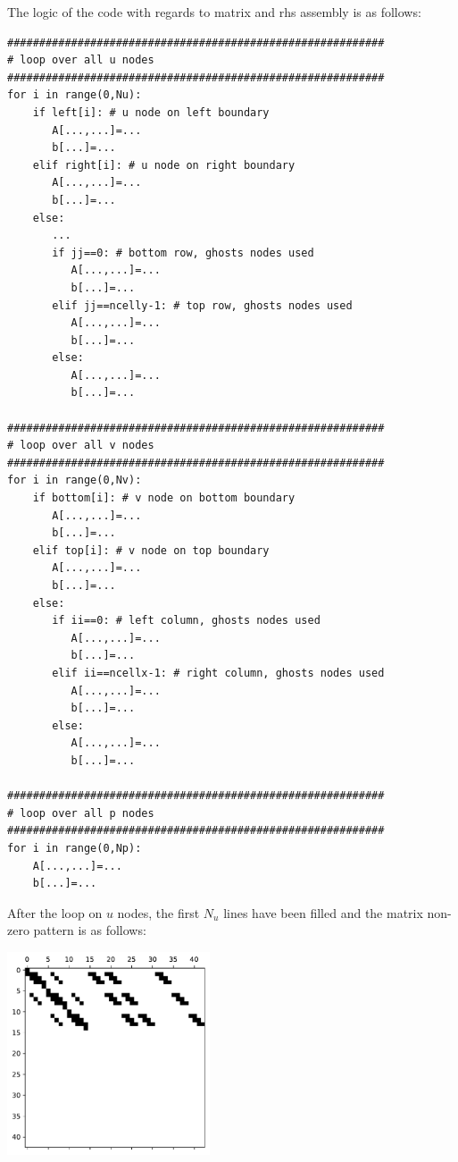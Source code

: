 \newpage
The logic of the code with regards to matrix and rhs assembly is as follows:

\begin{lstlisting}
###########################################################
# loop over all u nodes
###########################################################
for i in range(0,Nu):
    if left[i]: # u node on left boundary
       A[...,...]=...
       b[...]=...
    elif right[i]: # u node on right boundary
       A[...,...]=...
       b[...]=...
    else:
       ...
       if jj==0: # bottom row, ghosts nodes used
          A[...,...]=...
          b[...]=...
       elif jj==ncelly-1: # top row, ghosts nodes used
          A[...,...]=...
          b[...]=...
       else:
          A[...,...]=...
          b[...]=...

###########################################################
# loop over all v nodes
###########################################################
for i in range(0,Nv):
    if bottom[i]: # v node on bottom boundary
       A[...,...]=...
       b[...]=...
    elif top[i]: # v node on top boundary
       A[...,...]=...
       b[...]=...
    else:
       if ii==0: # left column, ghosts nodes used
          A[...,...]=...
          b[...]=...
       elif ii==ncellx-1: # right column, ghosts nodes used
          A[...,...]=...
          b[...]=...
       else:
          A[...,...]=...
          b[...]=...

###########################################################
# loop over all p nodes
###########################################################
for i in range(0,Np):
    A[...,...]=...
    b[...]=...
\end{lstlisting}

\newpage

After the loop on $u$ nodes, the first $N_u$ lines have been filled and the matrix non-zero pattern is as follows:
\begin{center}
\includegraphics[width=6cm]{python_codes/fieldstone_158/images/matrix_u.pdf}
\end{center}


